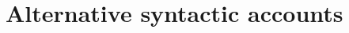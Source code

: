 \documentclass[12pt, letterpaper]{article}
\begin{document}
\section{Alternative syntactic accounts} \label{sec:HNPS}




\end{document}
